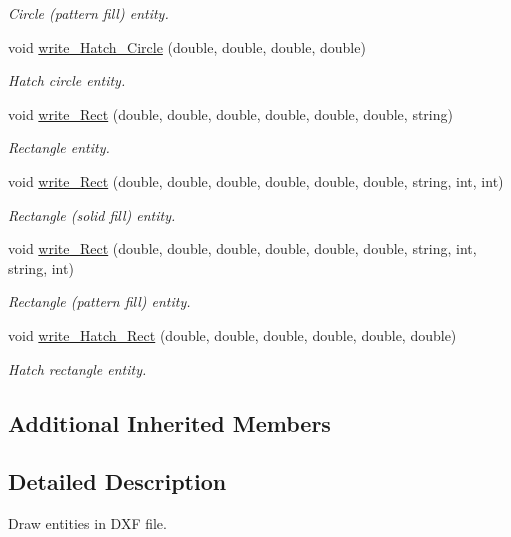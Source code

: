 \begin{DoxyCompactItemize}
\begin{DoxyCompactList}\small\item\em Circle (pattern fill) entity. \end{DoxyCompactList}\item 
void \hyperlink{classdxf_abc4eaf8ed68b05f25af6d31bd75ec3ce}{write\-\_\-\-Hatch\-\_\-\-Circle} (double, double, double, double)
\begin{DoxyCompactList}\small\item\em Hatch circle entity. \end{DoxyCompactList}\item 
void \hyperlink{classdxf_ae214af172af9ba53e10664cae1a53318}{write\-\_\-\-Rect} (double, double, double, double, double, double, string)
\begin{DoxyCompactList}\small\item\em Rectangle entity. \end{DoxyCompactList}\item 
void \hyperlink{classdxf_a67d61f8f015b73d585a5546ab915481d}{write\-\_\-\-Rect} (double, double, double, double, double, double, string, int, int)
\begin{DoxyCompactList}\small\item\em Rectangle (solid fill) entity. \end{DoxyCompactList}\item 
void \hyperlink{classdxf_ae6b53acc7a648fc435b25a8490947119}{write\-\_\-\-Rect} (double, double, double, double, double, double, string, int, string, int)
\begin{DoxyCompactList}\small\item\em Rectangle (pattern fill) entity. \end{DoxyCompactList}\item 
void \hyperlink{classdxf_ab4c7275d37a1151c9f2004d3711d5441}{write\-\_\-\-Hatch\-\_\-\-Rect} (double, double, double, double, double, double)
\begin{DoxyCompactList}\small\item\em Hatch rectangle entity. \end{DoxyCompactList}\end{DoxyCompactItemize}
\subsection*{Additional Inherited Members}


\subsection{Detailed Description}
Draw entities in D\-X\-F file. 

